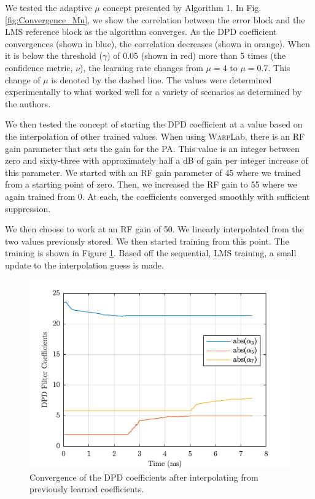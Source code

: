 We tested the adaptive $\mu$ concept presented by Algorithm 1. 
In Fig. \ref{fig:Convergence_Mu}, we show the correlation between the error block and the LMS reference block as the algorithm converges. 
As the DPD coefficient convergences (shown in blue), the correlation decreases (shown in orange). 
When it is below the threshold ($\gamma$) of 0.05 (shown in red) more than 5 times (the confidence metric, $\nu$), the learning rate changes from $\mu = 4$ to $\mu = 0.7$. 
This change of $\mu$ is denoted by the dashed line. 
The values were determined experimentally to what worked well for a variety of scenarios as determined by the authors. 

We then tested the concept of starting the DPD coefficient at a value based on the interpolation of other trained values. 
When using \textsc{Warp}Lab, there is an RF gain parameter that sets the gain for the PA. This value is an integer between zero and sixty-three with approximately half a dB of gain per integer increase of this parameter. We started with an RF gain parameter of 45 where we trained from a starting point of zero. Then, we increased the RF gain to 55 where we again trained from 0. At each, the coefficients converged smoothly with sufficient suppression. 

We then choose to work at an RF gain of 50. We linearly interpolated from the two values previously stored. We then started training from this point. The training is shown in Figure \ref{fig:Interpolate}. Based off the sequential, LMS training, a small update to the interpolation guess is made. 

\begin{figure}[t!] 
	\centering
	\includegraphics[]{Interpolate} 
	\caption{Convergence of the DPD coefficients after interpolating from previously learned coefficients.}
	\label{fig:Interpolate}
\end{figure}

